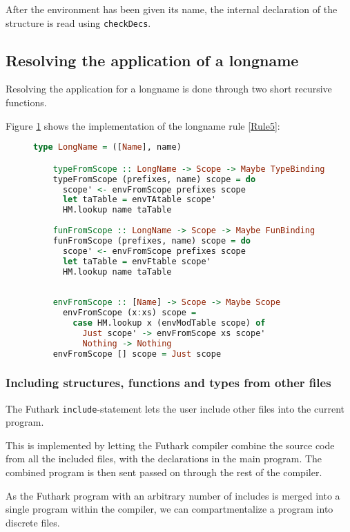 After the environment has been given its name, the internal declaration of the
structure is read using \texttt{checkDecs}.

\subsection{Resolving the application of a longname}
Resolving the application for a longname is done through two short recursive
functions.

Figure \ref{resolvelongname} shows the implementation of the longname rule
\ref{Rule5}:
\begin{figure}\label{resolvelongname}
  \begin{lstlisting}[language=Haskell]
    type LongName = ([Name], name)

    typeFromScope :: LongName -> Scope -> Maybe TypeBinding
    typeFromScope (prefixes, name) scope = do
      scope' <- envFromScope prefixes scope
      let taTable = envTAtable scope'
      HM.lookup name taTable
    
    funFromScope :: LongName -> Scope -> Maybe FunBinding
    funFromScope (prefixes, name) scope = do
      scope' <- envFromScope prefixes scope
      let taTable = envFtable scope'
      HM.lookup name taTable
    
    
    envFromScope :: [Name] -> Scope -> Maybe Scope
      envFromScope (x:xs) scope =
        case HM.lookup x (envModTable scope) of
          Just scope' -> envFromScope xs scope'
          Nothing -> Nothing
    envFromScope [] scope = Just scope
\end{lstlisting}
\end{figure}

\subsubsection{Including structures, functions and types from other files}
The Futhark \texttt{include}-statement lets the user include
other files into the current program.

This is implemented by letting the Futhark compiler combine the source code from
all the included files, with the declarations in the main program. The combined
program is then sent passed on through the rest of the compiler.

As the Futhark program with an arbitrary number of includes is merged into a
single program within the compiler, we can compartmentalize a program into
discrete files.


